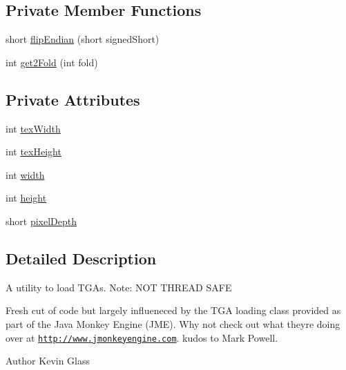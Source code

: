 \subsection*{Private Member Functions}
\begin{DoxyCompactItemize}
\item 
short \mbox{\hyperlink{classorg_1_1newdawn_1_1slick_1_1opengl_1_1_t_g_a_image_data_a17a25f35cb763e4698de412c2ef34493}{flip\+Endian}} (short signed\+Short)
\item 
int \mbox{\hyperlink{classorg_1_1newdawn_1_1slick_1_1opengl_1_1_t_g_a_image_data_ab9aff2ca0cec0b8ff114074236cdded1}{get2\+Fold}} (int fold)
\end{DoxyCompactItemize}
\subsection*{Private Attributes}
\begin{DoxyCompactItemize}
\item 
int \mbox{\hyperlink{classorg_1_1newdawn_1_1slick_1_1opengl_1_1_t_g_a_image_data_a1597fcbecdd0d2875a3950ebe60b2582}{tex\+Width}}
\item 
int \mbox{\hyperlink{classorg_1_1newdawn_1_1slick_1_1opengl_1_1_t_g_a_image_data_ab5bb366dc9a1fb7d18b96e732b8a74d5}{tex\+Height}}
\item 
int \mbox{\hyperlink{classorg_1_1newdawn_1_1slick_1_1opengl_1_1_t_g_a_image_data_a76539de4fa236043b0f8b31b0ce7c1cf}{width}}
\item 
int \mbox{\hyperlink{classorg_1_1newdawn_1_1slick_1_1opengl_1_1_t_g_a_image_data_ae129d18b6db032f7ef0ab8ebc795843b}{height}}
\item 
short \mbox{\hyperlink{classorg_1_1newdawn_1_1slick_1_1opengl_1_1_t_g_a_image_data_aa9222304ea8eae0cae78ff6ff0a7f8f2}{pixel\+Depth}}
\end{DoxyCompactItemize}


\subsection{Detailed Description}
A utility to load T\+G\+As. Note\+: N\+OT T\+H\+R\+E\+AD S\+A\+FE

Fresh cut of code but largely influeneced by the T\+GA loading class provided as part of the Java Monkey Engine (J\+ME). Why not check out what they\textquotesingle{}re doing over at \href{http://www.jmonkeyengine.com}{\tt http\+://www.\+jmonkeyengine.\+com}. kudos to Mark Powell.

\begin{DoxyAuthor}{Author}
Kevin Glass 
\end{DoxyAuthor}


